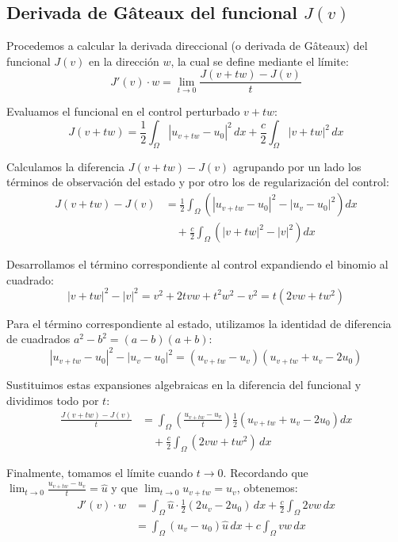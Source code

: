 \documentclass[11pt,a4paper]{article}
\begin{document}
	\subsection{Derivada de Gâteaux del funcional $J(v)$}
	Procedemos a calcular la derivada direccional (o derivada de Gâteaux) del funcional $J(v)$ en la dirección $w$, la cual se define mediante el límite:
	\begin{equation*}
		J'(v) \cdot w = \lim_{t \to 0} \frac{J(v+tw) - J(v)}{t}
	\end{equation*}
	
	Evaluamos el funcional en el control perturbado $v+tw$:
	\begin{equation*}
		J(v+tw) = \frac{1}{2} \int_\Omega |u_{v+tw} - u_0|^2 \, dx + \frac{c}{2} \int_\Omega |v+tw|^2 \, dx
	\end{equation*}
	
	Calculamos la diferencia $J(v+tw) - J(v)$ agrupando por un lado los términos de observación del estado y por otro los de regularización del control:
	\begin{align*}
		J(v+tw) - J(v) &= \frac{1}{2} \int_\Omega \left( |u_{v+tw} - u_0|^2 - |u_v - u_0|^2 \right) dx \\
		&\quad + \frac{c}{2} \int_\Omega \left( |v+tw|^2 - |v|^2 \right) dx
	\end{align*}
	
	Desarrollamos el término correspondiente al control expandiendo el binomio al cuadrado:
	\begin{equation*}
		|v+tw|^2 - |v|^2 = v^2 + 2tvw + t^2w^2 - v^2 = t(2vw + tw^2)
	\end{equation*}
	
	Para el término correspondiente al estado, utilizamos la identidad de diferencia de cuadrados $a^2 - b^2 = (a-b)(a+b)$:
	\begin{equation*}
		|u_{v+tw} - u_0|^2 - |u_v - u_0|^2 = (u_{v+tw} - u_v)(u_{v+tw} + u_v - 2u_0)
	\end{equation*}
	
	Sustituimos estas expansiones algebraicas en la diferencia del funcional y dividimos todo por $t$:
	\begin{align*}
		\frac{J(v+tw) - J(v)}{t} &= \int_\Omega \left( \frac{u_{v+tw} - u_v}{t} \right) \frac{1}{2} \left( u_{v+tw} + u_v - 2u_0 \right) dx \\
		&\quad + \frac{c}{2} \int_\Omega (2vw + tw^2) \, dx
	\end{align*}
	
	Finalmente, tomamos el límite cuando $t \to 0$. Recordando que $\lim_{t \to 0} \frac{u_{v+tw} - u_v}{t} = \hat{u}$ y que $\lim_{t \to 0} u_{v+tw} = u_v$, obtenemos:
	\begin{align*}
		J'(v) \cdot w &= \int_\Omega \hat{u} \cdot \frac{1}{2} (2u_v - 2u_0) \, dx + \frac{c}{2} \int_\Omega 2vw \, dx \\
		&= \int_\Omega (u_v - u_0)\hat{u} \, dx + c \int_\Omega v w \, dx
	\end{align*}
	
\end{document}
